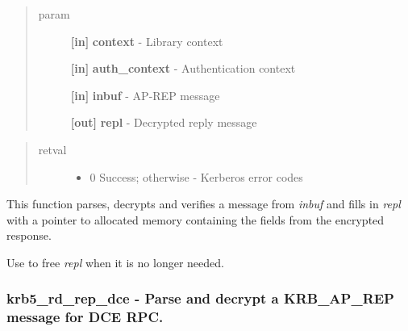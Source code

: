 \documentclass[letterpaper,10pt,english]{sphinxmanual}
\begin{document}
\begin{quote}\begin{description}
\item[{param}] \leavevmode
\textbf{{[}in{]}} \textbf{context} - Library context

\textbf{{[}in{]}} \textbf{auth\_context} - Authentication context

\textbf{{[}in{]}} \textbf{inbuf} - AP-REP message

\textbf{{[}out{]}} \textbf{repl} - Decrypted reply message

\end{description}\end{quote}
\begin{quote}\begin{description}
\item[{retval}] \leavevmode\begin{itemize}
\item {} 
0   Success; otherwise - Kerberos error codes

\end{itemize}

\end{description}\end{quote}

This function parses, decrypts and verifies a message from \emph{inbuf} and fills in \emph{repl} with a pointer to allocated memory containing the fields from the encrypted response.

Use {\hyperref[appdev/refs/api/krb5_free_ap_rep_enc_part:krb5_free_ap_rep_enc_part]{}} to free \emph{repl} when it is no longer needed.


\subsubsection{krb5\_rd\_rep\_dce -  Parse and decrypt a KRB\_AP\_REP message for DCE RPC.}
\label{appdev/refs/api/krb5_rd_rep_dce::doc}\label{appdev/refs/api/krb5_rd_rep_dce:krb5-rd-rep-dce-parse-and-decrypt-a-krb-ap-rep-message-for-dce-rpc}

\begin{fulllineitems}
\label{appdev/refs/api/krb5_rd_rep_dce:krb5_rd_rep_dce}
\end{fulllineitems}
\end{document}
